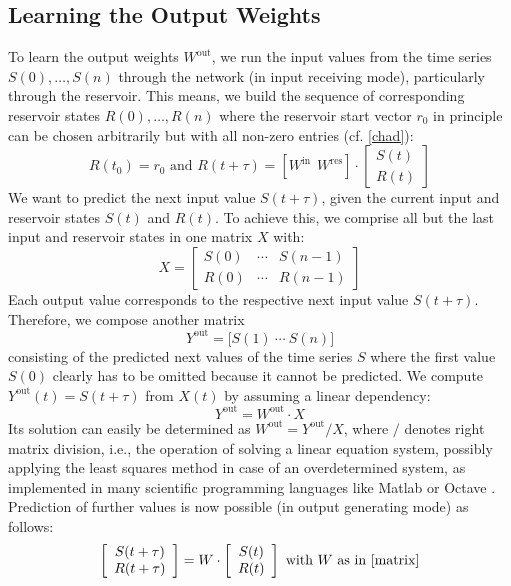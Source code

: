 \documentclass[twoside,11pt]{article}
\theoremstyle{definition}
\begin{document}
\subsection{Learning the Output Weights}\label{output}

To learn the output weights $W^\mathrm{out}$, we run the input values from the
time series $S(0),\dots,S(n)$ through the network (in input receiving mode),
particularly through the reservoir. This means, we build the sequence of
corresponding reservoir states $R(0),\dots,R(n)$ where the reservoir start
vector $r_0$ in principle can be chosen arbitrarily but with all non-zero
entries (cf. \cref{chad}):
\begin{equation}\label{Res}
	R(t_0) = r_0 \text{~and~} R(t+\tau) =
	\left[ W^\mathrm{in} ~~ W^\mathrm{res} \right] \cdot
	\left[ \begin{array}{c} S(t) \\ R(t) \end{array} \right]
\end{equation}
We want to predict the next input value $S(t+\tau)$, given the current input and
reservoir states $S(t)$ and $R(t)$. To achieve this, we comprise
all but the last input and reservoir states in one matrix $X$ with:
\begin{equation}\label{Xin}
    X = \left[ \begin{array}{ccc}
	S(0) & \cdots & S(n-1)\\
	R(0) & \cdots & R(n-1)
	\end{array} \right]
\end{equation}
Each output value corresponds to the respective next input value $S(t+\tau)$.
Therefore, we compose another matrix
\begin{equation}\label{Yout}
	Y^\mathrm{out} = \big[ S(1)\ \cdots\ S(n) \big]
\end{equation}
consisting of the predicted next values of the time series $S$
where the first value $S(0)$ clearly has to be omitted because it cannot be
predicted. We compute $Y^\mathrm{out}(t) = S(t+\tau)$ from $X(t)$ by assuming a
linear dependency:
\begin{equation}\label{linear}
	Y^\mathrm{out} = W^\mathrm{out} \cdot X
\end{equation}
Its solution can easily be determined as $W^\mathrm{out} = Y^\mathrm{out}/X$,
where $/$ denotes right matrix division, i.e., the operation of solving a linear
equation system, possibly applying the least squares method in case of an
overdetermined system, as implemented in many scientific programming languages
like Matlab \citep{HH17} or Octave \citep{EB+17}. Prediction of further values
is now possible (in output generating mode) as follows:
\begin{equation}\label{predict}
	\left[ \begin{array}{c} S(t+\tau) \\ R(t+\tau) \end{array} \right]
	= W \cdot \left[ \begin{array}{c} S(t) \\ R(t) \end{array} \right]
	\text{~with~} W \text{~as in \cref{matrix}}
\end{equation}
\end{document}
